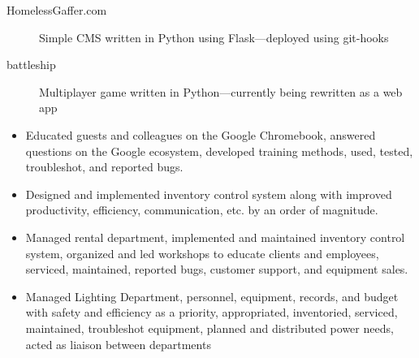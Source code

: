 \documentclass[letterpaper]{article}        %
\begin{document}

  \begin{description}
    \item[HomelessGaffer.com] Simple CMS written in Python using Flask---deployed using git-hooks
    \item[battleship] Multiplayer game written in Python---currently being rewritten as a web app
    
  \end{description}




  
    \begin{itemize}
    \item Educated guests and colleagues on the Google Chromebook, answered questions on the Google ecosystem, developed training methods, used, tested, troubleshot, and reported bugs.
    \end{itemize}
  
    \begin{itemize}
    \item Designed and implemented inventory control system along with improved productivity, efficiency, communication, etc. by an order of magnitude.
    \end{itemize}
  
    \begin{itemize}
    \item Managed rental department, implemented and maintained inventory control system, organized and led workshops to educate clients and employees, serviced, maintained, reported bugs, customer support, and equipment sales.
    \end{itemize}
  
    \begin{itemize}
    \item Managed Lighting Department, personnel, equipment, records, and budget with safety and efficiency as a priority, appropriated, inventoried, serviced, maintained, troubleshot equipment, planned and distributed power needs, acted as liaison between departments
    \end{itemize}
  
\end{document}
